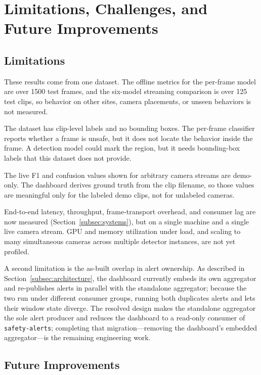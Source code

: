 \documentclass[conference]{IEEEtran}
\begin{document}
\section{Limitations, Challenges, and Future Improvements}
\label{sec:limitations}

\subsection{Limitations}

These results come from one dataset. The offline metrics for the
per-frame model are over 1500 test frames, and the six-model streaming
comparison is over 125 test clips, so behavior on other sites, camera
placements, or unseen behaviors is not measured.

The dataset has clip-level labels and no bounding boxes. The per-frame
classifier reports whether a frame is unsafe, but it does not locate the
behavior inside the frame. A detection model could mark the region, but
it needs bounding-box labels that this dataset does not provide.

The live F1 and confusion values shown for arbitrary camera streams are
demo-only. The dashboard derives ground truth from the clip filename, so
those values are meaningful only for the labeled demo clips, not for
unlabeled cameras.

End-to-end latency, throughput, frame-transport overhead, and consumer lag
are now measured (Section~\ref{subsec:systems}), but on a single machine and a
single live camera stream. GPU and memory utilization under load, and scaling to
many simultaneous cameras across multiple detector instances, are not yet
profiled.

A second limitation is the as-built overlap in alert ownership. As described in
Section~\ref{subsec:architecture}, the dashboard currently embeds its own
aggregator and re-publishes alerts in parallel with the standalone aggregator;
because the two run under different consumer groups, running both duplicates
alerts and lets their window state diverge. The resolved design makes the
standalone aggregator the sole alert producer and reduces the dashboard to a
read-only consumer of \texttt{safety-alerts}; completing that migration---removing
the dashboard's embedded aggregator---is the remaining engineering work.

\subsection{Future Improvements}
\end{document}
